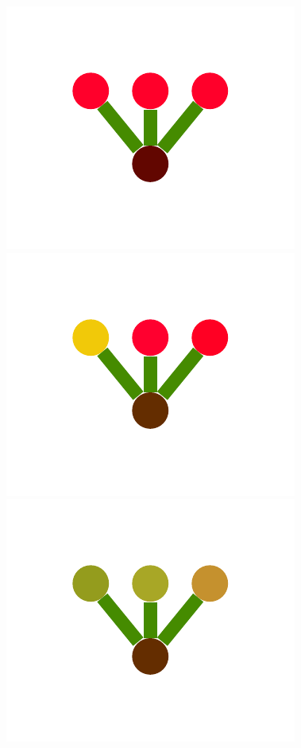 \documentclass[a4paper,10pt]{article}
\begin{document}
\begin{figure}
{    \includegraphics[scale=.2]{./figures/6-2-multiple-color-flower-data-6.pdf}
    \includegraphics[scale=.2]{./figures/6-2-multiple-color-flower-data-7.pdf}
    \includegraphics[scale=.2]{./figures/6-2-multiple-color-flower-data-8.pdf}
    \label{fig:exp-multiple-flower-data}
    }
\end{figure}
\end{document}
